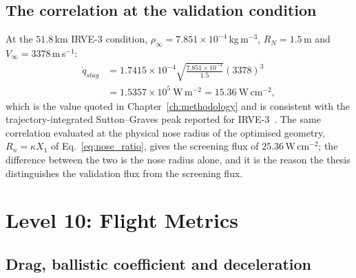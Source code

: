 \subsection{The correlation at the validation condition}

At the $51.8$\,km IRVE-3 condition, $\rho_\infty = 7.851\times10^{-4}$\,kg\,m$^{-3}$, $R_N = 1.5$\,m and $V_\infty = 3378$\,m\,s$^{-1}$:
\begin{equation}
\begin{aligned}
    \dot{q}_{stag} &= 1.7415\times10^{-4}\sqrt{\frac{7.851\times10^{-4}}{1.5}}\left(3378\right)^{3} \\
    &= 1.5357\times10^{5}\ \mathrm{W\,m^{-2}} = 15.36\ \mathrm{W\,cm^{-2}} ,
\end{aligned}
    \label{eq:app_sg_number}
\end{equation}
which is the value quoted in Chapter~\ref{ch:methodology} and is consistent with the trajectory-integrated Sutton--Graves peak reported for IRVE-3~\cite{rapisarda2023mdao}. The same correlation evaluated at the physical nose radius of the optimised geometry, $R_n = \kappa X_1$ of Eq.~\eqref{eq:nose_ratio}, gives the screening flux of $25.36$\,W\,cm$^{-2}$; the difference between the two is the nose radius alone, and it is the reason the thesis distinguishes the validation flux from the screening flux.

\section{Level 10: Flight Metrics}
\label{app:flight}

\subsection{Drag, ballistic coefficient and deceleration}

